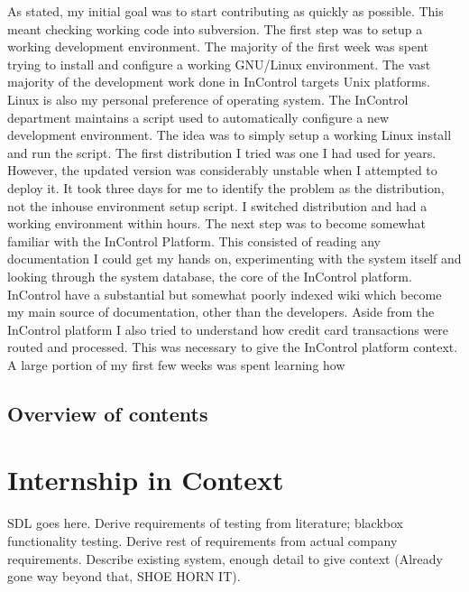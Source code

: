 \documentclass[a4paper, 11pt, titlepage]{article}
\begin{document}
As stated, my initial goal was to start contributing as quickly as possible. This meant checking working code into subversion. The first step was to setup a working development environment. 
The majority of the first week was spent trying to install and configure a working GNU/Linux environment. The vast majority of the development work done in InControl targets Unix platforms. Linux is also my personal preference of operating system. The InControl department maintains a script used to automatically configure a new development environment. The idea was to simply setup a working Linux install and run the script. The first distribution I tried was one I had used for years. However, the updated version was considerably unstable when I attempted to deploy it. It took three days for me to identify the problem as the distribution, not the inhouse environment setup script. I switched distribution and had a working environment within hours. The next step was to become somewhat familiar with the InControl Platform. This consisted of reading any documentation I could get my hands on, experimenting with the system itself and looking through the system database, the core of the InControl platform.
InControl have a substantial but somewhat poorly indexed wiki which become my main source of documentation, other than the developers. Aside from the InControl platform I also tried to understand how credit card transactions were routed and processed. This was necessary to give the InControl platform context.
A large portion of my first few weeks was spent learning how 

\subsection{Overview of contents}


\section{Internship in Context}
SDL goes here. Derive requirements of testing from literature; blackbox functionality testing. Derive rest of requirements from actual company requirements. Describe existing system, enough detail to give context (Already gone way beyond that, SHOE HORN IT).
\end{document}
